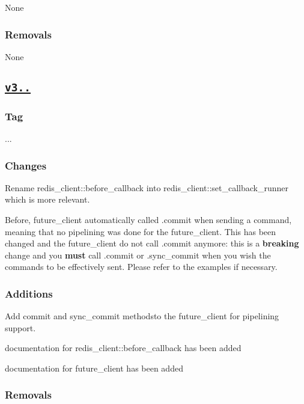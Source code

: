 None \subsubsection*{Removals}

None

\subsection*{\href{https://github.com/Cylix/cpp_redis/releases/tag/3.3.0}{\tt v3..}}

\subsubsection*{Tag}

{..}. \subsubsection*{Changes}


\begin{DoxyItemize}
\item Rename {\ttfamily redis\+\_\+client\+::before\+\_\+callback} into {\ttfamily redis\+\_\+client\+::set\+\_\+callback\+\_\+runner} which is more relevant.
\item Before, {\ttfamily future\+\_\+client} automatically called {\ttfamily .commit} when sending a command, meaning that no pipelining was done for the {\ttfamily future\+\_\+client}. This has been changed and the {\ttfamily future\+\_\+client} do not call {\ttfamily .commit} anymore\+: this is a {\bfseries breaking} change and you {\bfseries must} call {\ttfamily .commit} or {\ttfamily .sync\+\_\+commit} when you wish the commands to be effectively sent. Please refer to the examples if necessary. \subsubsection*{Additions}
\end{DoxyItemize}


\begin{DoxyItemize}
\item Add {\ttfamily commit} and {\ttfamily sync\+\_\+commit} methodsto the {\ttfamily future\+\_\+client} for pipelining support.
\item documentation for {\ttfamily redis\+\_\+client\+::before\+\_\+callback} has been added
\item documentation for {\ttfamily future\+\_\+client} has been added \subsubsection*{Removals}
\end{DoxyItemize}

